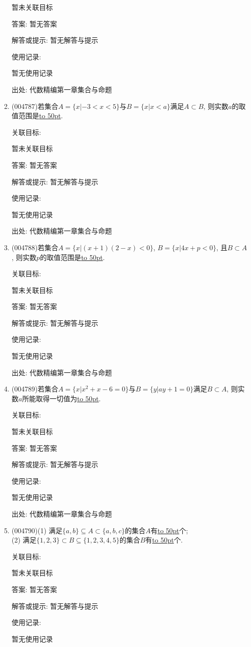 \documentclass[10pt,a4paper]{article}
\newcommand{\blank}[1]{\underline{\hbox to #1pt{}}}
\begin{document}
\begin{enumerate}[1.]
暂未关联目标

答案: 暂无答案

解答或提示: 暂无解答与提示

使用记录:

暂无使用记录


出处: 代数精编第一章集合与命题
\item { (004787)}若集合$A=\{x|-3<x<5\}$与$B=\{x|x<a\}$满足$A\subset B$, 则实数$a$的取值范围是\blank{50}.


关联目标:

暂未关联目标

答案: 暂无答案

解答或提示: 暂无解答与提示

使用记录:

暂无使用记录


出处: 代数精编第一章集合与命题
\item { (004788)}若集合$A=\{x|(x+1)(2-x)<0\}$, $B=\{x|4x+p<0\}$, 且$B\subset A$, 则实数$p$的取值范围是\blank{50}.


关联目标:

暂未关联目标

答案: 暂无答案

解答或提示: 暂无解答与提示

使用记录:

暂无使用记录


出处: 代数精编第一章集合与命题
\item { (004789)}若集合$A=\{x|x^2+x-6=0\}$与$B=\{y|ay+1=0\}$满足$B\subset A$, 则实数$a$所能取得一切值为\blank{50}.


关联目标:

暂未关联目标

答案: 暂无答案

解答或提示: 暂无解答与提示

使用记录:

暂无使用记录


出处: 代数精编第一章集合与命题
\item { (004790)}(1) 满足$\{a,b\}\subseteq A\subset \{a,b,c\}$的集合$A$有\blank{50}个;\\
(2) 满足$\{1,2,3\}\subset B\subseteq \{ 1,2,3,4,5\}$的集合$B$有\blank{50}个.


关联目标:

暂未关联目标

答案: 暂无答案

解答或提示: 暂无解答与提示

使用记录:

暂无使用记录



\end{enumerate}
\end{document}
